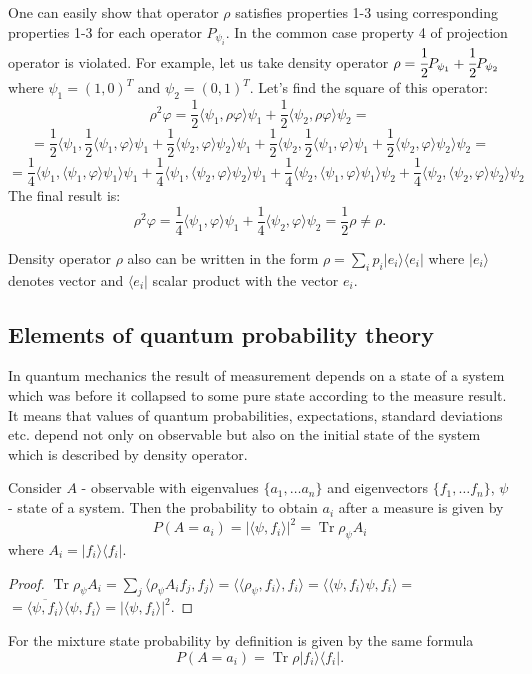 \documentclass[11pt]{article}
\DeclareMathOperator{\Tr}{Tr}
\begin{document}
One can easily show that operator $\rho$ satisfies properties 1-3 using corresponding properties 1-3 for each operator $P_{\psi_i}$. In the common case property 4 of projection operator is violated. For example, let us take density operator $\rho = \cfrac 12P_{\psi_1} + \cfrac 12P_{\psi_2}$ where $\psi_1 = (1, 0)^T$ and $\psi_2 = (0, 1)^T$. Let's find the square of this operator:
\[
\rho^2\varphi = \frac 12\langle\psi_1, \rho\varphi\rangle\psi_1 + \frac 12\langle\psi_2, \rho\varphi\rangle\psi_2 =
\]
\[
= \frac 12\langle\psi_1, \frac 12\langle\psi_1, \varphi\rangle\psi_1 + \frac 12\langle\psi_2, \varphi\rangle\psi_2 \rangle\psi_1 + \frac 12\langle\psi_2, \frac 12\langle\psi_1, \varphi\rangle\psi_1 + \frac 12\langle\psi_2, \varphi\rangle\psi_2 \rangle\psi_2 =
\]
\[
 = 
\frac 14\langle\psi_1, \langle\psi_1,\varphi\rangle\psi_1\rangle\psi_1 + \frac 14\langle\psi_1, \langle\psi_2,\varphi\rangle\psi_2\rangle\psi_1 +
\frac 14\langle\psi_2, \langle\psi_1,\varphi\rangle\psi_1\rangle\psi_2 + \frac 14\langle\psi_2, \langle\psi_2,\varphi\rangle\psi_2\rangle\psi_2
\]
The final result is:
\[
\rho^2\varphi = \frac 14 \langle\psi_1, \varphi\rangle\psi_1 + \frac 14\langle\psi_2, \varphi\rangle\psi_2 = \frac 12\rho \neq \rho.
\]


Density operator $\rho$ also can be written in the form $\rho = \sum_i p_i|e_i\rangle\langle e_i|$ where $|e_i\rangle$ denotes vector and $\langle e_i|$ scalar product with the vector $e_i$. 

\subsection{Elements of quantum probability theory}
In quantum mechanics the result of measurement depends on a state of a system which was before it collapsed to some pure state according to the measure result. It means that values of quantum probabilities, expectations, standard deviations etc. depend not only on observable but also on the initial state of the system which is described by density operator.

Consider $A$ - observable with eigenvalues $\{a_1,\ldots a_n\}$ and eigenvectors $\{f_1,\ldots f_n\}$, $\psi$ - state of a system. Then the probability to obtain $a_i$ after a measure is given by
\[
P(A = a_i) = |\langle\psi, f_i\rangle|^2 = \Tr \rho_\psi A_i
\]
where $A_i = |f_i\rangle \langle f_i|$.
\begin{proof}
$\Tr \rho_\psi A_i = \sum_j \langle\rho_\psi A_if_j, f_j\rangle = \langle \langle\rho_\psi, f_i\rangle, f_i\rangle = \langle \langle \psi, f_i\rangle\psi, f_i\rangle = $\\
$= \overline{\langle\psi, f_i\rangle} \langle\psi, f_i\rangle = |\langle\psi, f_i\rangle|^2.$
\end{proof}
For the mixture state probability by definition is given by the same formula
\[
P(A = a_i) = \Tr \rho |f_i\rangle \langle f_i|.
\]
\end{document}
